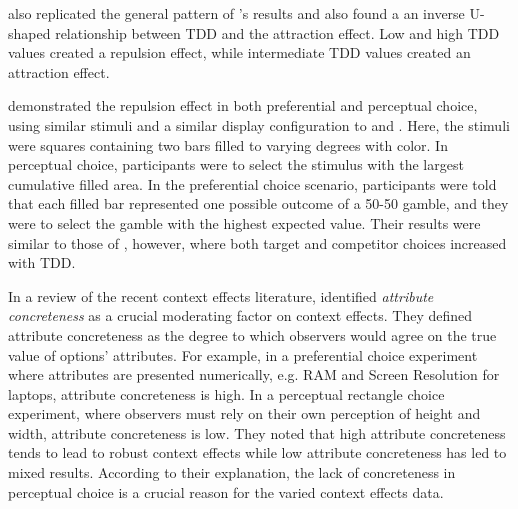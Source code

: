 \textcite{liaoInfluenceDistanceDecoy2021} also replicated the general pattern of \textcite{spektorWhenGoodLooks2018b}'s results and also found a an inverse U-shaped relationship between TDD and the attraction effect. Low and high TDD values created a repulsion effect, while intermediate TDD values created an attraction effect. 

\textcite{spektorRepulsionEffectPreferential2022} demonstrated the repulsion effect in both preferential and perceptual choice, using similar stimuli and a similar display configuration to \textcite{spektorWhenGoodLooks2018b} and \textcite{liaoInfluenceDistanceDecoy2021}. Here, the stimuli were squares containing two bars filled to varying degrees with color. In perceptual choice, participants were to select the stimulus with the largest cumulative filled area. In the preferential choice scenario, participants were told that each filled bar represented one possible outcome of a 50-50 gamble, and they were to select the gamble with the highest expected value. Their results were similar to those of \textcite{spektorWhenGoodLooks2018b}, however, where both target and competitor choices increased with TDD.

In a review of the recent context effects literature, \textcite{spektorElusivenessContextEffects2021} identified \textit{attribute concreteness} as a crucial moderating factor on context effects. They defined attribute concreteness as the degree to which observers would agree on the true value of options' attributes. For example, in a preferential choice experiment where attributes are presented numerically, e.g. RAM and Screen Resolution for laptops, attribute concreteness is high. In a perceptual rectangle choice experiment, where observers must rely on their own perception of height and width, attribute concreteness is low. They noted that high attribute concreteness tends to lead to robust context effects while low attribute concreteness has led to mixed results. According to their explanation, the lack of concreteness in perceptual choice is a crucial reason for the varied context effects data. 

